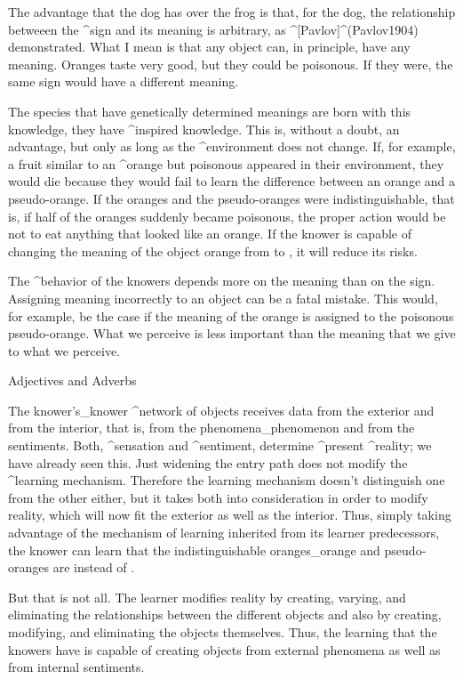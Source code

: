 The advantage that the dog has over the frog is that, for the dog, the
relationship betweeen the ^{sign} and its meaning is arbitrary, as
^[Pavlov]^(Pavlov1904) demonstrated. What I mean is that any object can,
in principle, have any meaning. Oranges taste very good, but they could
be poisonous. If they were, the same sign would have a different
meaning.

The species that have genetically determined meanings are born with this
knowledge, they have ^{inspired knowledge}. This is, without a doubt, an
advantage, but only as long as the ^{environment} does not change. If,
for example, a fruit similar to an ^{orange} but poisonous appeared in
their environment, they would die because they would fail to learn the
difference between an orange and a pseudo-orange. If the oranges and the
pseudo-oranges were indistinguishable, that is, if half of the oranges
suddenly became poisonous, the proper action would be not to eat
anything that looked like an orange. If the knower is capable of
changing the meaning of the object orange from  to
, it will reduce its risks.

The ^{behavior} of the knowers depends more on the meaning than on the
sign. Assigning meaning incorrectly to an object can be a fatal mistake.
This would, for example, be the case if the meaning of the orange is
assigned to the poisonous pseudo-orange. What we perceive is less
important than the meaning that we give to what we perceive.


\Section Adjectives and Adverbs

The knower's_{knower} ^{network of objects} receives data from the
exterior and from the interior, that is, from the phenomena_{phenomenon}
and from the sentiments. Both, ^{sensation} and ^{sentiment}, determine
^{present} ^{reality}; we have already seen this. Just widening the
entry path does not modify the ^{learning} mechanism. Therefore the
learning mechanism doesn't distinguish one from the other either, but it
takes both into consideration in order to modify reality, which will now
fit the exterior as well as the interior. Thus, simply taking advantage
of the mechanism of learning inherited from its learner predecessors,
the knower can learn that the indistinguishable oranges_{orange} and
pseudo-oranges are  instead of .

But that is not all. The learner modifies reality by creating, varying,
and eliminating the relationships between the different objects and also
by creating, modifying, and eliminating the objects themselves. Thus,
the learning that the knowers have is capable of creating objects from
external phenomena as well as from internal sentiments.


